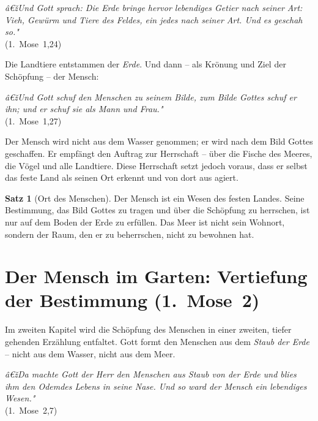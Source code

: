 ﻿\documentclass[a4paper,12pt]{article}
\theoremstyle{definition}
\newtheorem{theorem}{Satz}[section]
\begin{document}
\begin{displayquote}
    \textit{â€žUnd Gott sprach: Die Erde bringe hervor lebendiges Getier nach seiner
    Art: Vieh, Gewürm und Tiere des Feldes, ein jedes nach seiner Art. Und es
    geschah so."}\\
    \hfill (1.~Mose~1,24)
\end{displayquote}

Die Landtiere entstammen der \textit{Erde}. Und dann -- als Krönung und Ziel
der Schöpfung -- der Mensch:

\begin{displayquote}
    \textit{â€žUnd Gott schuf den Menschen zu seinem Bilde, zum Bilde Gottes schuf
    er ihn; und er schuf sie als Mann und Frau."}\\
    \hfill (1.~Mose~1,27)
\end{displayquote}

Der Mensch wird nicht aus dem Wasser genommen; er wird nach dem Bild Gottes
geschaffen. Er empfängt den Auftrag zur Herrschaft -- über die Fische des Meeres,
die Vögel und alle Landtiere. Diese Herrschaft setzt jedoch voraus, dass er selbst
das feste Land als seinen Ort erkennt und von dort aus agiert.

\begin{theorem}[Ort des Menschen]
    Der Mensch ist ein Wesen des festen Landes. Seine Bestimmung, das Bild Gottes
    zu tragen und über die Schöpfung zu herrschen, ist nur auf dem Boden der Erde
    zu erfüllen. Das Meer ist nicht sein Wohnort, sondern der Raum, den er zu
    beherrschen, nicht zu bewohnen hat.
\end{theorem}

\section{Der Mensch im Garten: Vertiefung der Bestimmung (1.~Mose~2)}

Im zweiten Kapitel wird die Schöpfung des Menschen in einer zweiten, tiefer
gehenden Erzählung entfaltet. Gott formt den Menschen aus dem \textit{Staub der
Erde} -- nicht aus dem Wasser, nicht aus dem Meer.

\begin{displayquote}
    \textit{â€žDa machte Gott der Herr den Menschen aus Staub von der Erde und
    blies ihm den Odemdes Lebens in seine Nase. Und so ward der Mensch ein
    lebendiges Wesen."}\\
    \hfill (1.~Mose~2,7)
\end{displayquote}
\end{document}
